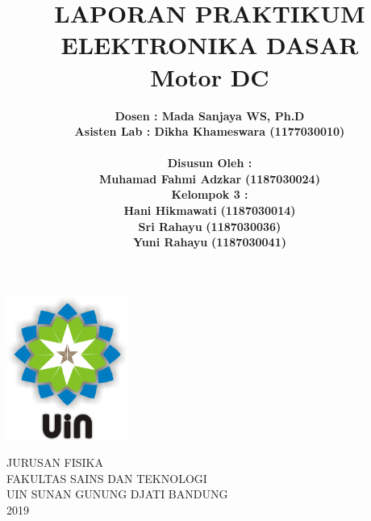 \documentclass[12pt,a4paper]{article}
\begin{document}
\onehalfspacing
\begin{titlepage}

\title{\textbf{LAPORAN PRAKTIKUM ELEKTRONIKA DASAR
\\ Motor DC }}  %
\author{\textbf {Dosen : Mada Sanjaya WS, Ph.D  }
\\ \textbf{Asisten Lab : Dikha Khameswara (1177030010)}
\\ \textbf{ }
\\ \textbf{Disusun Oleh :}
\\ \textbf{Muhamad Fahmi Adzkar} \textbf {(1187030024)}
\\ \textbf{Kelompok 3 :}
\\ \textbf{Hani Hikmawati} \textbf {(1187030014)}
\\ \textbf{Sri Rahayu} \textbf {(1187030036)}
\\ \textbf{Yuni Rahayu} \textbf {(1187030041)}}

\maketitle
\begin{center}
\vspace{1cm}
\includegraphics[width=4cm]{uin.png}
\vspace{1cm}

JURUSAN FISIKA\\
FAKULTAS SAINS DAN TEKNOLOGI\\
UIN SUNAN GUNUNG DJATI BANDUNG\\
2019\\
\end{center}
\end{titlepage}
\end{document}
